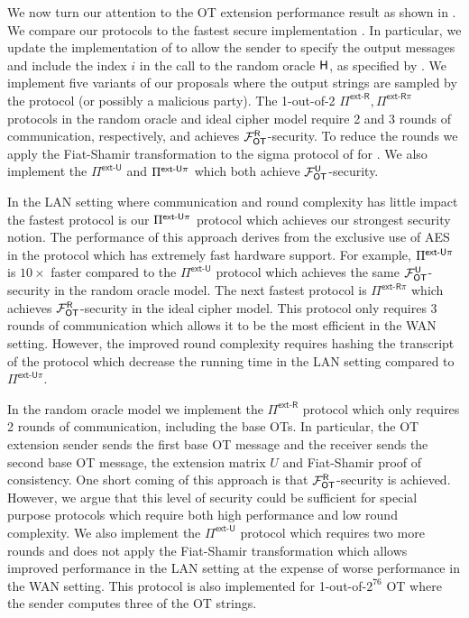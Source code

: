 We now turn our attention to the  OT extension performance result as shown in . We compare our protocols to the fastest secure implementation \cite{C:KelOrsSch15,libOTe}. In particular, we update the \cite{libOTe} implementation of \cite{C:KelOrsSch15} to allow the sender to specify the output messages and include the index $i$ in the call to the random oracle $\mathsf{H}$, as specified by \cite{C:KelOrsSch15}. We implement five variants of our proposals where the output strings are sampled by the protocol (or possibly a malicious party). The 1-out-of-2 $\Pi^{\textsf{ext-R}},\Pi^{\textsf{ext-R}\pi}$ protocols in the random oracle and ideal cipher model require 2 and 3 rounds of communication, respectively, and achieves $\mathcal{F}_{\mathsf{OT}}^\mathsf{R}$-security. To reduce the rounds we apply the Fiat-Shamir transformation \cite{C:FiaSha86} to the sigma protocol of \cite{C:KelOrsSch15} for . We also implement the $\Pi^{\textsf{ext-U}}$ and $\Pi^{\textsf{ext-\ensuremath{\mathsf{U}}}\pi}$ which both achieve $\mathcal{F}_{\mathsf{OT}}^\mathsf{U}$-security. 

In the LAN setting where communication and round complexity has little impact the fastest protocol is our $\Pi^{\textsf{ext-\ensuremath{\mathsf{U}}}\pi}$ protocol which achieves our strongest security notion. The performance of this approach derives from the exclusive use of AES in the protocol which has extremely fast hardware support. For example, $\Pi^{\textsf{ext-\ensuremath{\mathsf{U}}}\pi}$ is $10\times$ faster compared to the $\Pi^{\textsf{ext-U}}$ protocol which achieves the same $\mathcal{F}_{\mathsf{OT}}^\mathsf{U}$-security in the random oracle model. The next fastest protocol is $\Pi^{\textsf{ext-R}\pi}$ which achieves $\mathcal{F}_{\mathsf{OT}}^\mathsf{R}$-security in the ideal cipher model. This protocol only requires 3 rounds of communication which allows it to be the most efficient in the WAN setting. However, the improved round complexity requires hashing the transcript of the protocol which decrease the running time in the LAN setting compared to $\Pi^{\textsf{ext-U}\pi}$.

In the random oracle model we implement the $\Pi^{\textsf{ext-R}}$ protocol which only requires 2 rounds of communication, including the base OTs. In particular, the OT extension sender sends the first base OT message and the receiver sends the second base OT message, the extension matrix $U$ and Fiat-Shamir proof of consistency. One short coming of this approach is that $\mathcal{F}_{\mathsf{OT}}^\mathsf{R}$-security is achieved. However, we argue that this level of security could be sufficient for special purpose protocols which require both high performance and low round complexity. We also implement the $\Pi^{\textsf{ext-U}}$ protocol which requires two more rounds and does not apply the Fiat-Shamir transformation which allows improved performance in the LAN setting at the expense of worse performance in the WAN setting.  This protocol is also implemented for 1-out-of-$2^{76}$ OT where the sender computes three of the OT strings. 

